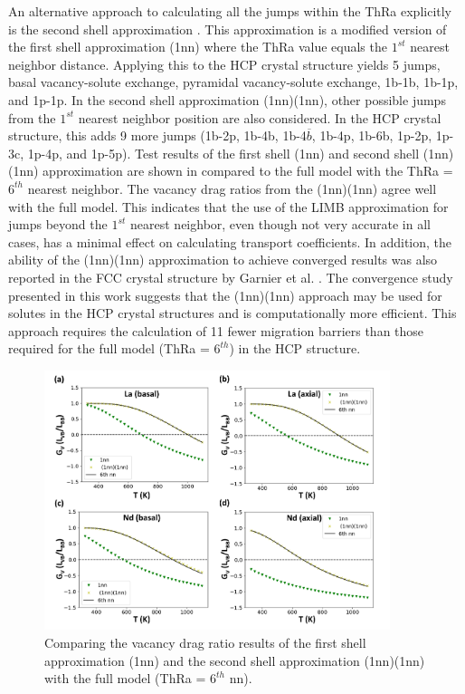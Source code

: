 \documentclass[preprint,12pt]{elsarticle}
\providecommand{\DIFaddbeginFL}{} %
\providecommand{\DIFaddendFL}{} %
\providecommand{\DIFdelbeginFL}{} %
\providecommand{\DIFdelendFL}{} %
\newcommand{\DIFscaledelfig}{0.5}
\newlength{\DIFdelgraphicswidth} %
\newlength{\DIFdelgraphicsheight} %
\newcommand{\DIFaddincludegraphics}[2][]{{\color{blue}\fbox{\DIFOincludegraphics[#1]{#2}}}} %
\newcommand{\DIFdelincludegraphics}[2][]{%
\sbox{\DIFdelgraphicsbox}{\DIFOincludegraphics[#1]{#2}}%
\settoboxwidth{\DIFdelgraphicswidth}{\DIFdelgraphicsbox} %
\settoboxtotalheight{\DIFdelgraphicsheight}{\DIFdelgraphicsbox} %
\scalebox{\DIFscaledelfig}{%
\parbox[b]{\DIFdelgraphicswidth}{\usebox{\DIFdelgraphicsbox}\\[-\baselineskip] \rule{\DIFdelgraphicswidth}{0em}}\llap{\resizebox{\DIFdelgraphicswidth}{\DIFdelgraphicsheight}{%
\setlength{\unitlength}{\DIFdelgraphicswidth}%
\begin{picture}(1,1)%
\thicklines\linethickness{2pt} %
{\color[rgb]{1,0,0}\put(0,0){\framebox(1,1){}}}%
{\color[rgb]{1,0,0}\put(0,0){\line( 1,1){1}}}%
{\color[rgb]{1,0,0}\put(0,1){\line(1,-1){1}}}%
\end{picture}%
}\hspace*{3pt}}} %
} %
\DeclareRobustCommand{\DIFaddbeginFL}{\DIFOaddbeginFL \let\includegraphics\DIFaddincludegraphics} %
\DeclareRobustCommand{\DIFaddendFL}{\DIFOaddendFL \let\includegraphics\DIFOincludegraphics} %
\DeclareRobustCommand{\DIFdelbeginFL}{\DIFOdelbeginFL \let\includegraphics\DIFdelincludegraphics} %
\DeclareRobustCommand{\DIFdelendFL}{\DIFOaddendFL \let\includegraphics\DIFOincludegraphics} %
\begin{document}
An alternative approach to calculating all the jumps within the ThRa explicitly is the second shell approximation \cite{nastar_mean_2005, garnier_quantitative_2014}. This approximation is a modified version of the first shell approximation (1nn) where the ThRa value equals the $1^{st}$ nearest neighbor distance. Applying this to the HCP crystal structure yields 5 jumps, basal vacancy-solute exchange, pyramidal vacancy-solute exchange, 1b-1b, 1b-1p, and 1p-1p. In the second shell approximation (1nn)(1nn), other possible jumps from the $1^{st}$ nearest neighbor position are also considered. In the HCP crystal structure, this adds 9 more jumps (1b-2p, 1b-4b, 1b-4$\overline{b}$, 1b-4p, 1b-6b, 1p-2p, 1p-3c, 1p-4p, and 1p-5p). Test results of the first shell (1nn) and second shell (1nn)(1nn) approximation are shown in  compared to the full model with the ThRa = $6^{th}$ nearest neighbor. The vacancy drag ratios from the (1nn)(1nn) agree well with the full model. This indicates that the use of the LIMB approximation for jumps beyond the $1^{st}$ nearest neighbor, even though not very accurate in all cases, has a minimal effect on calculating transport coefficients. In addition, the ability of the (1nn)(1nn) approximation to achieve converged results was also reported in the FCC crystal structure by Garnier et al. \cite{garnier_quantitative_2014}. The convergence study presented in this work suggests that the (1nn)(1nn) approach may be used for solutes in the HCP crystal structures and is computationally more efficient. This approach requires the calculation of 11 fewer migration barriers than those required for the full model (ThRa = $6^{th}$) in the HCP structure.

\begin{figure}[h!]
    \centering
    \DIFdelbeginFL %
\DIFdelendFL \DIFaddbeginFL \includegraphics[width=0.9\textwidth]{11_nn_convergence_2nd_shell.jpg}
    \DIFaddendFL \caption{Comparing the vacancy drag ratio results of the first shell approximation (1nn) and the second shell approximation (1nn)(1nn) with the full model (ThRa = $6^{th}$ nn).}
    \label{fig:convergence_2nd_shell}
\end{figure}
\end{document}

